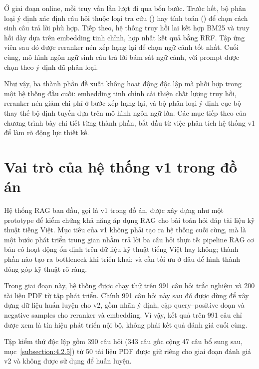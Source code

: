 \documentclass[../DoAn.tex]{subfiles}
\begin{document}
Ở giai đoạn online, mỗi truy vấn lần lượt đi qua bốn bước. Trước hết, bộ phân loại ý định xác định câu hỏi thuộc loại tra cứu () hay tính toán () để chọn cách sinh câu trả lời phù hợp. Tiếp theo, hệ thống truy hồi lai kết hợp BM25 và truy hồi dày dựa trên embedding tinh chỉnh, hợp nhất kết quả bằng RRF. Tập ứng viên sau đó được reranker nén xếp hạng lại để chọn ngữ cảnh tốt nhất. Cuối cùng, mô hình ngôn ngữ sinh câu trả lời bám sát ngữ cảnh, với prompt được chọn theo ý định đã phân loại.

Như vậy, ba thành phần đề xuất không hoạt động độc lập mà phối hợp trong một hệ thống đầu cuối: embedding tinh chỉnh cải thiện chất lượng truy hồi, reranker nén giảm chi phí ở bước xếp hạng lại, và bộ phân loại ý định cục bộ thay thế bộ định tuyến dựa trên mô hình ngôn ngữ lớn. Các mục tiếp theo của chương trình bày chi tiết từng thành phần, bắt đầu từ việc phân tích hệ thống v1 để làm rõ động lực thiết kế.

\section{Vai trò của hệ thống v1 trong đồ án}
\label{section:3.1}

Hệ thống RAG ban đầu, gọi là v1 trong đồ án, được xây dựng như một prototype để kiểm chứng khả năng áp dụng RAG cho bài toán hỏi đáp tài liệu kỹ thuật tiếng Việt. Mục tiêu của v1 không phải tạo ra hệ thống cuối cùng, mà là một bước phát triển trung gian nhằm trả lời ba câu hỏi thực tế: pipeline RAG cơ bản có hoạt động ổn định trên dữ liệu kỹ thuật tiếng Việt hay không; thành phần nào tạo ra bottleneck khi triển khai; và cần tối ưu ở đâu để hình thành đóng góp kỹ thuật rõ ràng.

Trong giai đoạn này, hệ thống được chạy thử trên 991 câu hỏi trắc nghiệm và 200 tài liệu PDF từ tập phát triển. Chính 991 câu hỏi này sau đó được dùng để xây dựng dữ liệu huấn luyện cho v2, gồm nhãn ý định, cặp query--positive đoạn và negative samples cho reranker và embedding. Vì vậy, kết quả trên 991 câu chỉ được xem là tín hiệu phát triển nội bộ, không phải kết quả đánh giá cuối cùng.

Tập kiểm thử độc lập gồm 390 câu hỏi (343 câu gốc cộng 47 câu  bổ sung sau, mục~\ref{subsection:4.2.5}) từ 50 tài liệu PDF được giữ riêng cho giai đoạn đánh giá v2 và không được sử dụng để huấn luyện.
\end{document}
